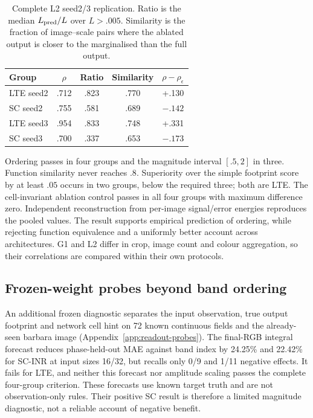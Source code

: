 \begin{table}[t]\centering\small
\caption{Complete L2 seed2/3 replication. Ratio is the median $L_{\rm pred}/L$ over $L>.005$. Similarity is the fraction of image--scale pairs where the ablated output is closer to the marginalised than the full output.}\label{tab:l2-main}
\begin{tabular}{lcccc}\toprule
Group & $\rho$ & Ratio & Similarity & $\rho-\rho_\epsilon$\\\midrule
LTE seed2 & .712 & .823 & .770 & +.130\\
SC seed2 & .755 & .581 & .689 & $-.142$\\
LTE seed3 & .954 & .833 & .748 & +.331\\
SC seed3 & .700 & .337 & .653 & $-.173$\\\bottomrule
\end{tabular}
\end{table}
Ordering passes in four groups and the magnitude interval $[.5,2]$ in three. Function similarity never reaches $.8$. Superiority over the simple footprint score by at least $.05$ occurs in two groups, below the required three; both are LTE. The cell-invariant ablation control passes in all four groups with maximum difference zero. Independent reconstruction from per-image signal/error energies reproduces the pooled values. The result supports empirical prediction of ordering, while rejecting function equivalence and a uniformly better account across architectures. G1 and L2 differ in crop, image count and colour aggregation, so their correlations are compared within their own protocols.

\subsection{Frozen-weight probes beyond band ordering}\label{sec:probe-main}
An additional frozen diagnostic separates the input observation, true output footprint and network cell hint on 72 known continuous fields and the already-seen barbara image (Appendix~\ref{app:readout-probes}). The final-RGB integral forecast reduces phase-held-out MAE against band index by 24.25\% and 22.42\% for SC-INR at input sizes 16/32, but recalls only 0/9 and 1/11 negative effects. It fails for LTE, and neither this forecast nor amplitude scaling passes the complete four-group criterion. These forecasts use known target truth and are not observation-only rules. Their positive SC result is therefore a limited magnitude diagnostic, not a reliable account of negative benefit.

